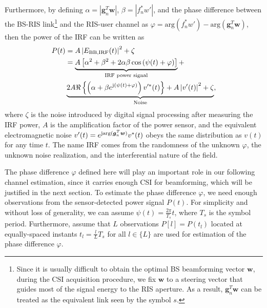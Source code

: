 \documentclass[conference,10pt,twocolumn]{IEEEtran}
\theoremstyle{nonumberplain}
\def \arg {\text{arg}}
\begin{document}
    Furthermore, by defining $\alpha = \left\vert\bm g_{n}^{T}\bm w\right\vert$, $\beta = \left\vert f_{n}^{*} w' \right\vert$, and the phase difference between the \ac{BS}-RIS link\footnote{Since it is usually difficult to obtain the optimal BS beamforming vector $\bm w$, during the CSI acquisition procedure, we fix $\bm w$ to a steering vector that guides most of the signal energy to the RIS aperture. As a result, $\bm g_n^T \bm w$ can be treated as the equivalent link seen by the symbol $s$.} and the RIS-user channel as $\varphi = \arg\left(f_{n}^{*}w'\right)-\arg\left(\bm g_{n}^{T}\bm w\right)$, then the power of the \ac{IRF} can be written as
    \begin{equation}
        \label{eqn:power of interference}
        \begin{aligned}
            P(t)&=A \left| E_{{\rm BB, IRF}} (t)\right |^{2}+\zeta\\
            &=\underbrace{A\left[\alpha^{2}+\beta^{2}+2\alpha\beta\cos\left(\psi(t)+\varphi\right)\right]}_{\text{IRF power signal}}+\\
            & \underbrace{2A\Re\left\{\left(\alpha+\beta e^{{\rm j}\left(\psi(t)+\varphi\right)}\right)v'^{*}(t)\right\}+A\left|v'(t)\right|^{2}+\zeta}_{\text{Noise}},\\
        \end{aligned}
    \end{equation}
    where $\zeta$ is the noise introduced by digital signal processing after measuring the IRF power, $A$ is the amplification factor of the power sensor, and the equivalent electromagnetic noise $v'(t) = e^{{\rm j}{\rm arg}({\bm g}_n^T \bm w)}v^*(t)$ obeys the same distribution as $v(t)$ for any time $t$.
    The name IRF comes from the randomness of the unknown $\varphi$, the unknown noise realization, and the interferential nature of the field.

    The phase difference $\varphi$ defined here will play an important role in our following channel estimation, since it carries enough CSI for beamforming, which will be justified in the next section. To estimate the phase difference $\varphi$, we need enough observations from the sensor-detected power signal $P(t)$. For simplicity and without loss of generality, we can assume $\psi(t)=\frac{2\pi}{T_{s}} t$, where $T_s$ is the symbol period. Furthermore, assume that $L$ observations $P[l]=P(t_{l})$ located at equally-spaced instants $t_{l}=\frac{l}{L}T_{s}$ for all $l\in \{L\}$
    are used for estimation of the phase difference $\varphi$.
\end{document}
